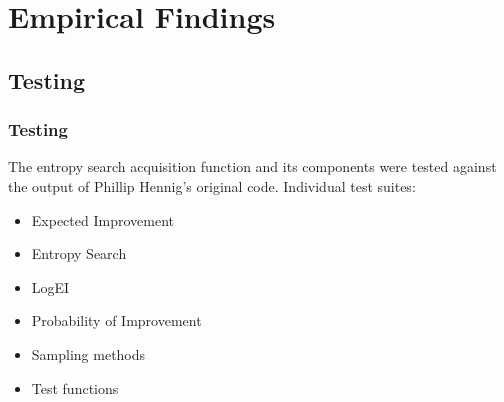 \documentclass[10pt,handout]{beamer}
\begin{document}
\section{Empirical Findings}

\subsection{Testing}
\begin{frame}
\frametitle{Testing}

The entropy search acquisition function and its components were tested
against the output of Phillip Hennig's original code. Individual test suites:

\begin{itemize}
  \item Expected Improvement
  \item Entropy Search
  \item LogEI
  \item Probability of Improvement
  \item Sampling methods
  \item Test functions
\end{itemize}
\end{frame}





\end{document}
